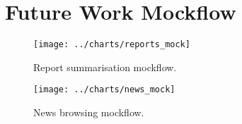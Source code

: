 \clearpage
\section{Future Work Mockflow}\label{sec:future-work-mockflow}
\begin{figure}[ht]
    \centering
    \texttt{[image: ../charts/reports\_mock]}
    \caption{Report summarisation mockflow.}
    \label{fig:future-work-mockflow-report}
\end{figure}

\begin{figure}[ht]
    \centering
    \texttt{[image: ../charts/news\_mock]}
    \caption{News browsing mockflow.}
    \label{fig:future-work-mockflow-news}
\end{figure}